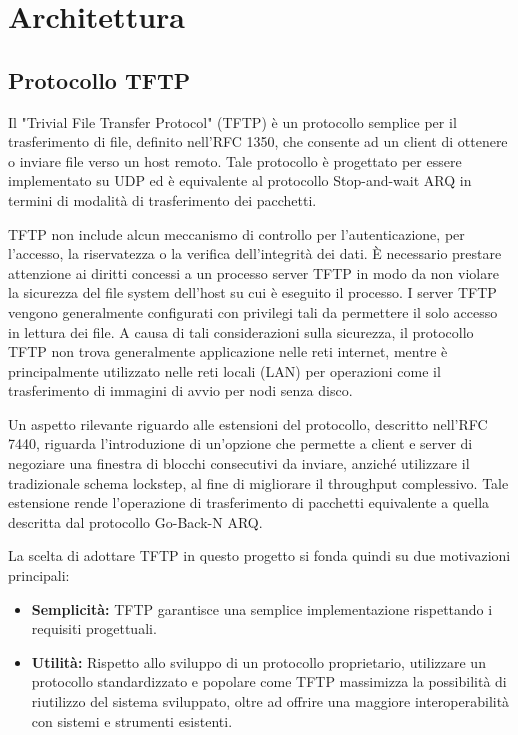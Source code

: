 \documentclass[12pt]{article}
\begin{document}
\section{Architettura} {


\subsection{Protocollo TFTP}

Il "Trivial File Transfer Protocol" (TFTP) è un protocollo semplice per il trasferimento di file, definito nell'RFC 1350, che consente ad un client di ottenere o inviare file verso un host remoto.
Tale protocollo è progettato per essere implementato su UDP ed è equivalente al protocollo Stop-and-wait ARQ in termini di modalità di trasferimento dei pacchetti.

TFTP non include alcun meccanismo di controllo per l'autenticazione, per l'accesso, la riservatezza o la verifica dell'integrità dei dati. È necessario prestare attenzione ai diritti concessi a un processo server TFTP in modo da non violare la sicurezza del file system dell'host su cui è eseguito il processo.
I server TFTP vengono generalmente configurati con privilegi tali da permettere il solo accesso in lettura dei file.
A causa di tali considerazioni sulla sicurezza, il protocollo TFTP non trova generalmente applicazione nelle reti internet, mentre è principalmente utilizzato nelle reti locali (LAN) per operazioni come il trasferimento di immagini di avvio per nodi senza disco.

Un aspetto rilevante riguardo alle estensioni del protocollo, descritto nell'RFC 7440, riguarda l'introduzione di un'opzione che permette a client e server di negoziare una finestra di blocchi consecutivi da inviare, anziché utilizzare il tradizionale schema lockstep, al fine di migliorare il throughput complessivo. Tale estensione rende l'operazione di trasferimento di pacchetti equivalente a quella descritta dal protocollo Go-Back-N ARQ.

La scelta di adottare TFTP in questo progetto si fonda quindi su due motivazioni principali:
\begin{itemize}
    \item \textbf{Semplicità:} TFTP garantisce una semplice implementazione rispettando i requisiti progettuali.
    \item \textbf{Utilità:} Rispetto allo sviluppo di un protocollo proprietario, utilizzare un protocollo standardizzato e popolare come TFTP massimizza la possibilità di riutilizzo del sistema sviluppato, oltre ad offrire una maggiore interoperabilità con sistemi e strumenti esistenti.
\end{itemize}

}
\end{document}
